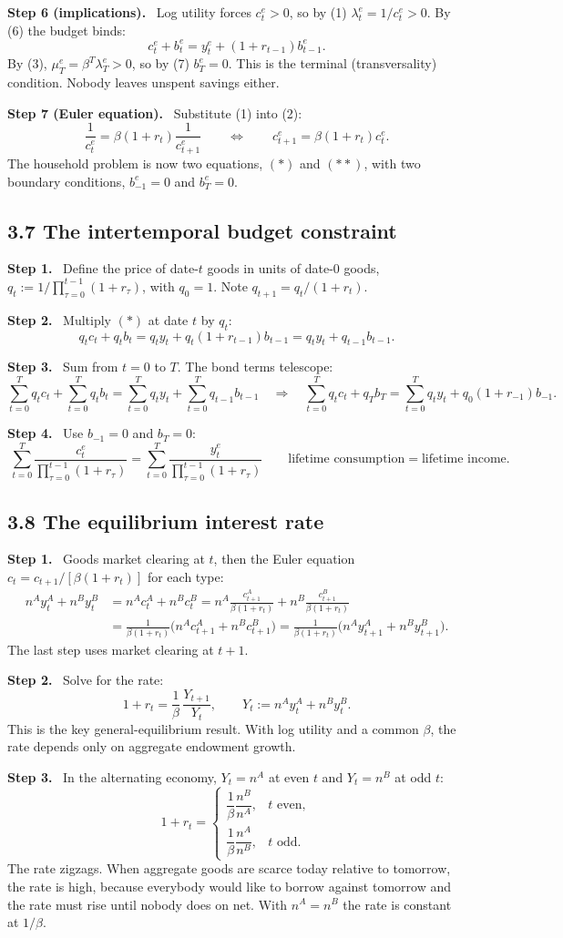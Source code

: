 \documentclass[12pt]{article}
\newcommand{\st}[1]{\par\smallskip\textbf{Step #1.}\ }
\newcommand{\ans}[1]{\[\boxed{\ #1\ }\]}
\begin{document}
\st{6 (implications)} Log utility forces $c^e_t>0$, so by (1) $\lambda^e_t=1/c^e_t>0$.
By (6) the budget binds:
\[
c^e_t+b^e_t=y^e_t+(1+r_{t-1})b^e_{t-1}.\tag{$*$}
\]
By (3), $\mu^e_T=\beta^T\lambda^e_T>0$, so by (7) $b^e_T=0$. This is the
terminal (transversality) condition. Nobody leaves unspent savings either.

\st{7 (Euler equation)} Substitute (1) into (2):
\ans{\frac{1}{c^e_t}=\beta(1+r_t)\frac{1}{c^e_{t+1}}\qquad\Longleftrightarrow\qquad c^e_{t+1}=\beta(1+r_t)c^e_t .\tag{$**$}}
The household problem is now two equations, $(*)$ and $(**)$, with two boundary
conditions, $b^e_{-1}=0$ and $b^e_T=0$.

\subsection*{3.7 The intertemporal budget constraint}
\st{1} Define the price of date-$t$ goods in units of date-0 goods,
$q_t:=1/\prod_{\tau=0}^{t-1}(1+r_\tau)$, with $q_0=1$. Note $q_{t+1}=q_t/(1+r_t)$.
\st{2} Multiply $(*)$ at date $t$ by $q_t$:
\[
q_tc_t+q_tb_t=q_ty_t+q_t(1+r_{t-1})b_{t-1}=q_ty_t+q_{t-1}b_{t-1}.
\]
\st{3} Sum from $t=0$ to $T$. The bond terms telescope:
\[
\sum_{t=0}^Tq_tc_t+\sum_{t=0}^Tq_tb_t=\sum_{t=0}^Tq_ty_t+\sum_{t=0}^{T}q_{t-1}b_{t-1}
\quad\Longrightarrow\quad
\sum_{t=0}^Tq_tc_t+q_Tb_T=\sum_{t=0}^Tq_ty_t+q_0(1+r_{-1})b_{-1}.
\]
\st{4} Use $b_{-1}=0$ and $b_T=0$:
\ans{\sum_{t=0}^T\frac{c^e_t}{\prod_{\tau=0}^{t-1}(1+r_\tau)}=\sum_{t=0}^T\frac{y^e_t}{\prod_{\tau=0}^{t-1}(1+r_\tau)}\qquad\text{lifetime consumption}=\text{lifetime income.}}

\subsection*{3.8 The equilibrium interest rate}
\st{1} Goods market clearing at $t$, then the Euler equation $c_t=c_{t+1}/[\beta(1+r_t)]$ for each type:
\begin{align*}
n^Ay^A_t+n^By^B_t&=n^Ac^A_t+n^Bc^B_t
=n^A\frac{c^A_{t+1}}{\beta(1+r_t)}+n^B\frac{c^B_{t+1}}{\beta(1+r_t)}\\
&=\frac{1}{\beta(1+r_t)}\big(n^Ac^A_{t+1}+n^Bc^B_{t+1}\big)
=\frac{1}{\beta(1+r_t)}\big(n^Ay^A_{t+1}+n^By^B_{t+1}\big).
\end{align*}
The last step uses market clearing at $t+1$.
\st{2} Solve for the rate:
\ans{1+r_t=\frac{1}{\beta}\,\frac{Y_{t+1}}{Y_t},\qquad Y_t:=n^Ay^A_t+n^By^B_t .}
This is the key general-equilibrium result. With log utility and a common
$\beta$, the rate depends only on aggregate endowment growth.
\st{3} In the alternating economy, $Y_t=n^A$ at even $t$ and $Y_t=n^B$ at odd $t$:
\[
1+r_t=\begin{cases}\dfrac1\beta\dfrac{n^B}{n^A}, & t\text{ even},\\[2ex]\dfrac1\beta\dfrac{n^A}{n^B}, & t\text{ odd}.\end{cases}
\]
The rate zigzags. When aggregate goods are scarce today relative to tomorrow,
the rate is high, because everybody would like to borrow against tomorrow and
the rate must rise until nobody does on net. With
$n^A=n^B$ the rate is constant at $1/\beta$.
\end{document}

